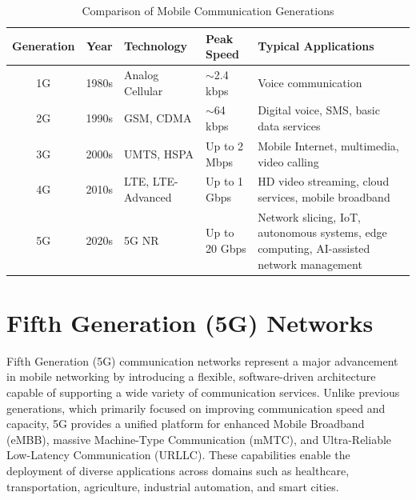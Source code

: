 \documentclass[12pt,a4paper]{report}
\begin{document}
	
	\begin{table}[H]
		\centering
		\caption{Comparison of Mobile Communication Generations}
		\label{tab:mobile_generations}
		
		\begin{tabular}{|c|c|p{3cm}|p{2.5cm}|p{5cm}|}
			\hline
			
			\textbf{Generation} &
			\textbf{Year} &
			\textbf{Technology} &
			\textbf{Peak Speed} &
			\textbf{Typical Applications}
			\\
			\hline
			
			1G &
			1980s &
			Analog Cellular &
			$\sim$2.4 kbps &
			Voice communication
			\\
			\hline
			
			2G &
			1990s &
			GSM, CDMA &
			$\sim$64 kbps &
			Digital voice, SMS, basic data services
			\\
			\hline
			
			3G &
			2000s &
			UMTS, HSPA &
			Up to 2 Mbps &
			Mobile Internet, multimedia, video calling
			\\
			\hline
			
			4G &
			2010s &
			LTE, LTE-Advanced &
			Up to 1 Gbps &
			HD video streaming, cloud services, mobile broadband
			\\
			\hline
			
			5G &
			2020s &
			5G NR &
			Up to 20 Gbps &
			Network slicing, IoT, autonomous systems, edge computing, AI-assisted network management
			\\
			\hline
			
		\end{tabular}
		
	\end{table}
	
	\section{Fifth Generation (5G) Networks}
	\label{sec:5g}
	
	Fifth Generation (5G) communication networks represent a major advancement in mobile networking by introducing a flexible, software-driven architecture capable of supporting a wide variety of communication services. Unlike previous generations, which primarily focused on improving communication speed and capacity, 5G provides a unified platform for enhanced Mobile Broadband (eMBB), massive Machine-Type Communication (mMTC), and Ultra-Reliable Low-Latency Communication (URLLC). These capabilities enable the deployment of diverse applications across domains such as healthcare, transportation, agriculture, industrial automation, and smart cities.
	
\end{document}
